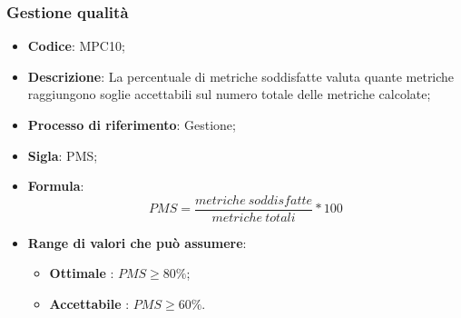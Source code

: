\subsubsection{Gestione qualità}
\vspace{-1cm}
\begin{itemize}
	\item \textbf{Codice}: MPC10;
	\item \textbf{Descrizione}: La percentuale di metriche soddisfatte valuta quante metriche raggiungono soglie accettabili sul numero totale delle metriche calcolate;
	\item \textbf{Processo di riferimento}: Gestione;
	\item \textbf{Sigla}: PMS;
	\item \textbf{Formula}: \[ PMS = \frac{metriche \ soddisfatte}{metriche \ totali} \ast 100\]
	\item \textbf{Range di valori che può assumere}: 
		\begin{itemize}
			\item \textbf{Ottimale} : $PMS \geq 80 \%$;
			\item \textbf{Accettabile} : $PMS \geq 60 \%$.
		\end{itemize}
\end{itemize}